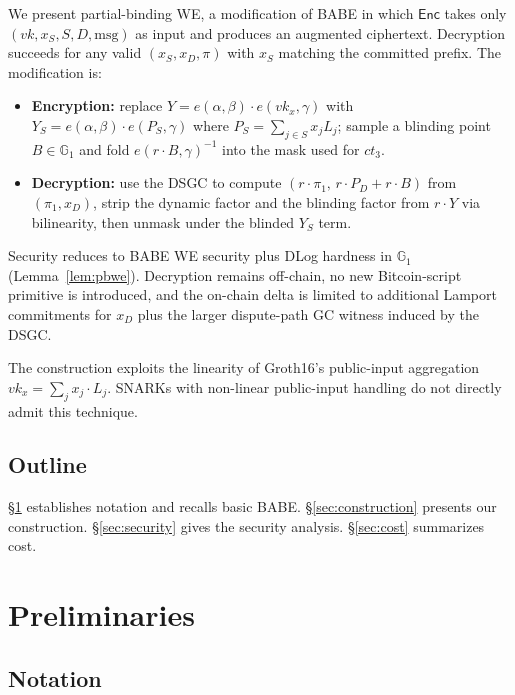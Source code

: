 \documentclass[11pt]{article}
\newcommand{\Gone}{\mathbb{G}_1}
\newcommand{\msg}{\mathrm{msg}}
\newcommand{\Enc}{\mathsf{Enc}}
\begin{document}
We present partial-binding WE, a modification of BABE in which
$\Enc$ takes only $(vk, x_S, S, D, \msg)$ as input and produces an
augmented ciphertext. Decryption succeeds for any valid
$(x_S, x_D, \pi)$ with $x_S$ matching the committed prefix. The
modification is:

\begin{itemize}
  \item \textbf{Encryption:} replace $Y = e(\alpha, \beta) \cdot e(vk_x, \gamma)$ with
    $Y_S = e(\alpha, \beta) \cdot e(P_S, \gamma)$ where
    $P_S = \sum_{j \in S} x_j L_j$; sample a blinding point
    $B \in \Gone$ and fold $e(r \cdot B, \gamma)^{-1}$ into the
    mask used for $ct_3$.
  \item \textbf{Decryption:} use the DSGC to compute
    $(r \cdot \pi_1,\, r \cdot P_D + r \cdot B)$ from
    $(\pi_1, x_D)$, strip the dynamic factor and the blinding
    factor from $r \cdot Y$ via bilinearity, then unmask under
    the blinded $Y_S$ term.
\end{itemize}

Security reduces to BABE WE security plus DLog hardness in $\Gone$
(Lemma~\ref{lem:pbwe}). Decryption remains off-chain, no new
Bitcoin-script primitive is introduced, and the on-chain delta is
limited to additional Lamport commitments for $x_D$ plus the larger
dispute-path GC witness induced by the DSGC.

The construction exploits the linearity of Groth16's public-input
aggregation $vk_x = \sum_j x_j \cdot L_j$. SNARKs with non-linear
public-input handling do not directly admit this technique.

\subsection{Outline}

\S\ref{sec:prelim} establishes notation and recalls basic BABE.
\S\ref{sec:construction} presents our construction.
\S\ref{sec:security} gives the security analysis.
\S\ref{sec:cost} summarizes cost.

\section{Preliminaries}\label{sec:prelim}

\subsection{Notation}
\end{document}
